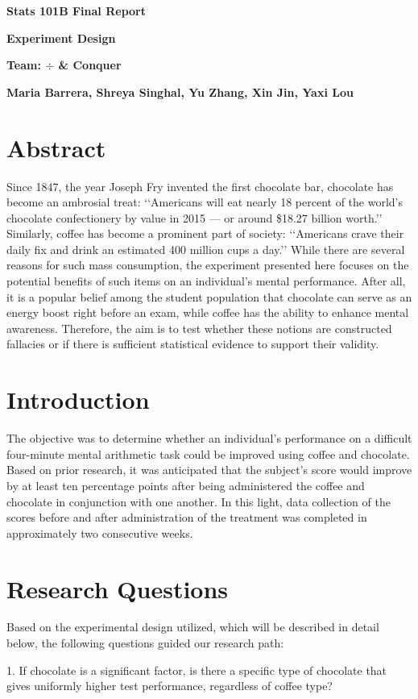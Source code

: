 \documentclass[12pt]{article}
\begin{document}
\begin{flushleft}
\centerline{\textbf{ Stats 101B Final Report}}
\centerline{\textbf{ Experiment Design }}
\centerline{\textbf{ Team: $\div$ \& Conquer}}
\centerline{\textbf{ Maria Barrera,  Shreya Singhal,  Yu Zhang,  Xin Jin,  Yaxi Lou}}
\tableofcontents
\newpage

\section{Abstract}
\bigskip
Since 1847, the year Joseph Fry invented the first chocolate bar, chocolate has become an ambrosial treat: \lq\lq Americans will eat nearly 18 percent of the world's chocolate confectionery by value in 2015 — or around \$18.27 billion worth.\rq\rq\cite{cite1} Similarly, coffee has become a prominent part of society: \lq\lq Americans crave their daily fix and drink an estimated 400 million cups a day.\rq\rq\cite{cite2} While there are several reasons for such mass consumption, the experiment presented here focuses on the potential benefits of such items on an individual's mental performance. After all, it is a popular belief among the student population that chocolate can serve as an energy boost right before an exam, while coffee has the ability to enhance mental awareness. Therefore, the aim is to test whether these notions are constructed fallacies or if there is sufficient statistical evidence to support their validity.
\bigskip
\section{Introduction}
\bigskip
The objective was to determine whether an individual's performance on a difficult four-minute mental arithmetic task could be improved using coffee and chocolate. Based on prior research, it was anticipated that the subject\rq s score would improve by at least ten percentage points after being administered the coffee and chocolate in conjunction with one another. In this light, data collection of the scores before and after administration of the treatment was completed in approximately two consecutive weeks.
\bigskip
\section{Research Questions}
\bigskip
Based on the experimental design utilized, which will be described in detail below, the following questions guided our research path:

1. If chocolate is a significant factor, is there a specific type of chocolate that gives uniformly higher test performance, regardless of coffee type?


\end{flushleft}
\end{document}
